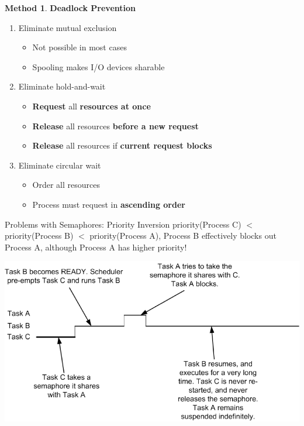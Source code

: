 \documentclass[12pt,a4paper]{article}
\theoremstyle{definition}
\newtheorem{method}{Method}[section]
\newenvironment{myitemize}
{ \begin{itemize}
    \setlength{\itemsep}{5pt}
    \setlength{\parskip}{0pt}
    \setlength{\parsep}{0pt}     }
{ \end{itemize}                  }
\newenvironment{myenumerate}
{ \begin{enumerate}
    \setlength{\itemsep}{5pt}
    \setlength{\parskip}{0pt}
    \setlength{\parsep}{0pt}     }
{ \end{enumerate}                }
\begin{document}
\begin{method}{\textbf{Deadlock Prevention}}
	\begin{myenumerate}
		\item Eliminate mutual exclusion
		\begin{myitemize}
			\item Not possible in most cases
			\item Spooling makes I/O devices sharable
		\end{myitemize}
		\item Eliminate hold-and-wait 
		\begin{myitemize}
			\item \textbf{Request} all \textbf{resources at once}
			\item \textbf{Release} all resources \textbf{before a new request}
			\item \textbf{Release} all resources if \textbf{current request blocks}
		\end{myitemize}
		\item Eliminate circular wait
		\begin{myitemize}
			\item Order all resources
			\item Process must request in \textbf{ascending order}
		\end{myitemize}
	\end{myenumerate}
\end{method}

\begin{tcolorbox}
	\textsf{Problems with Semaphores: Priority Inversion}	priority(Process C) $<$ priority(Process B) $<$ priority(Process A), Process B effectively blocks out Process A, although Process A has higher priority!
	
	\includegraphics[scale=0.5]{m1/priorityInversion}
	\centering
\end{tcolorbox}
\end{document}
